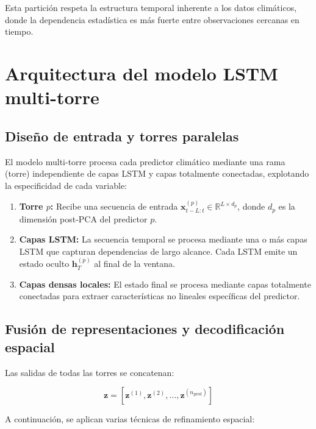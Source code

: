 Esta partición respeta la estructura temporal inherente a los datos climáticos, donde la dependencia estadística es más fuerte entre observaciones cercanas en tiempo.

\section{Arquitectura del modelo LSTM multi-torre}
\label{sec:arquitectura_lstm}

\subsection{Diseño de entrada y torres paralelas}
El modelo multi-torre procesa cada predictor climático mediante una rama (torre) independiente de capas LSTM y capas totalmente conectadas, explotando la especificidad de cada variable:

\begin{enumerate}
    \item \textbf{Torre $p$:} Recibe una secuencia de entrada $\mathbf{x}_{t-L:t}^{(p)} \in \mathbb{R}^{L \times d_p}$, donde $d_p$ es la dimensión post-PCA del predictor $p$.
    \item \textbf{Capas LSTM:} La secuencia temporal se procesa mediante una o más capas LSTM que capturan dependencias de largo alcance. Cada LSTM emite un estado oculto $\mathbf{h}_T^{(p)}$ al final de la ventana.
    \item \textbf{Capas densas locales:} El estado final se procesa mediante capas totalmente conectadas para extraer características no lineales específicas del predictor.
\end{enumerate}

\subsection{Fusión de representaciones y decodificación espacial}
Las salidas de todas las torres se concatenan:

\begin{equation}
    \mathbf{z} = [\mathbf{z}^{(1)}, \mathbf{z}^{(2)}, \ldots, \mathbf{z}^{(n_{\text{pred}})}]
\end{equation}

A continuación, se aplican varias técnicas de refinamiento espacial:

